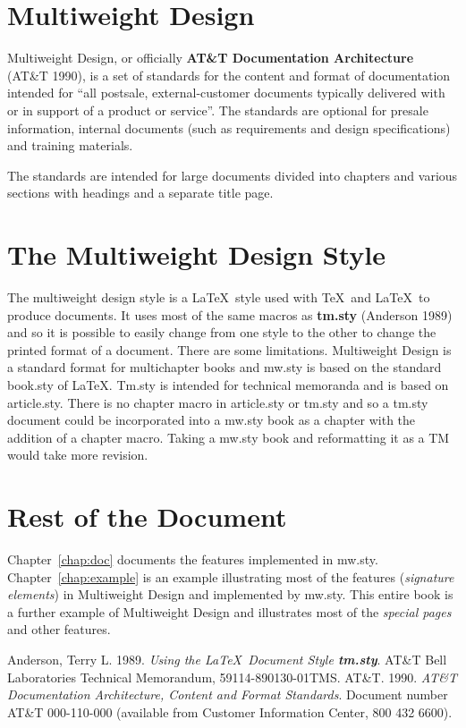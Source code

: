 \section{Multiweight Design} Multiweight Design, or officially {\bf
AT\&T Documentation Architecture} (AT\&T 1990), is a set of standards
for the content and format of documentation intended for ``all
postsale, external-customer documents typically delivered with or in
support of a product or service''.  The standards are optional for
presale information, internal documents (such as requirements and
design specifications) and training materials.

The standards are intended for large documents divided into chapters
and various sections with headings and a separate title page.  

\section{The Multiweight Design Style} The multiweight design style is
a \LaTeX\ style used with \TeX\ and \LaTeX\ to produce documents.  It
uses most of the same macros as {\bf tm.sty} (Anderson 1989) and so it
is possible to easily change from one style to the other to change the
printed format of a document.  There are some limitations.
Multiweight Design is a standard format for multichapter books and
mw.sty is based on the standard book.sty of \LaTeX .  Tm.sty is
intended for technical memoranda and is based on article.sty.  There
is no chapter macro in article.sty or tm.sty and so a tm.sty document
could be incorporated into a mw.sty book as a chapter with the
addition of a chapter macro.  Taking a mw.sty book and reformatting it
as a TM would take more revision.


\section{Rest of the Document}

Chapter~\ref{chap:doc} documents the features implemented in mw.sty.
Chapter~\ref{chap:example} is an example illustrating most of the
features ({\it signature elements}) in Multiweight Design and
implemented by mw.sty.  This entire book  is a further example of
Multiweight Design and illustrates most of the {\it special pages} and
other features. 

\begin{thechapterbibliography}{99}
Anderson, Terry L. 1989. {\it Using the
\LaTeX\ Document Style {\bf tm.sty}}.  AT\&T Bell Laboratories
Technical Memorandum, 59114-890130-01TMS.
AT\&T. 1990. {\it AT\&T Documentation Architecture, Content and Format
Standards}.  Document number AT\&T 000-110-000 (available from
Customer Information Center, 800 432 6600).
\end{thechapterbibliography}
%
